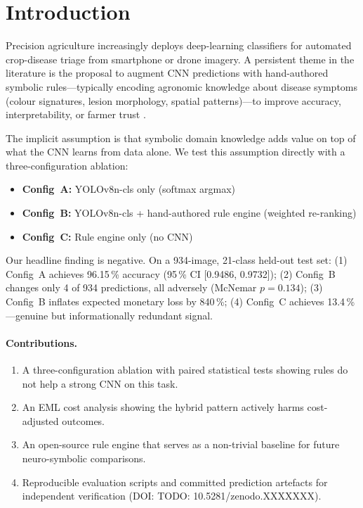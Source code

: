 \documentclass[runningheads]{llncs}
\newcommand{\zenododoi}{TODO: 10.5281/zenodo.XXXXXXX}   %
\begin{document}
\section{Introduction}

Precision agriculture increasingly deploys deep-learning classifiers for
automated crop-disease triage from smartphone or drone imagery. A persistent
theme in the literature is the proposal to augment CNN predictions with
hand-authored symbolic rules---typically encoding agronomic knowledge about
disease symptoms (colour signatures, lesion morphology, spatial
patterns)---to improve accuracy, interpretability, or farmer trust
\cite{Ferentinos2018,Ramcharan2017}.

The implicit assumption is that symbolic domain knowledge adds value on top
of what the CNN learns from data alone. We test this assumption directly with
a three-configuration ablation:

\begin{itemize}
  \item \textbf{Config~A:} YOLOv8n-cls only (softmax argmax)
  \item \textbf{Config~B:} YOLOv8n-cls + hand-authored rule engine (weighted re-ranking)
  \item \textbf{Config~C:} Rule engine only (no CNN)
\end{itemize}

Our headline finding is negative. On a 934-image, 21-class held-out test set:
(1) Config~A achieves 96.15\,\% accuracy (95\,\% CI [0.9486, 0.9732]);
(2) Config~B changes only 4 of 934 predictions, all adversely (McNemar
$p = 0.134$);
(3) Config~B inflates expected monetary loss by 840\,\%;
(4) Config~C achieves 13.4\,\%---genuine but informationally redundant signal.

\paragraph{Contributions.}
\begin{enumerate}
  \item A three-configuration ablation with paired statistical tests showing
        rules do not help a strong CNN on this task.
  \item An EML cost analysis showing the hybrid pattern actively harms
        cost-adjusted outcomes.
  \item An open-source rule engine that serves as a non-trivial baseline for
        future neuro-symbolic comparisons.
  \item Reproducible evaluation scripts and committed prediction artefacts
        for independent verification (DOI: \zenododoi).
\end{enumerate}
\end{document}
